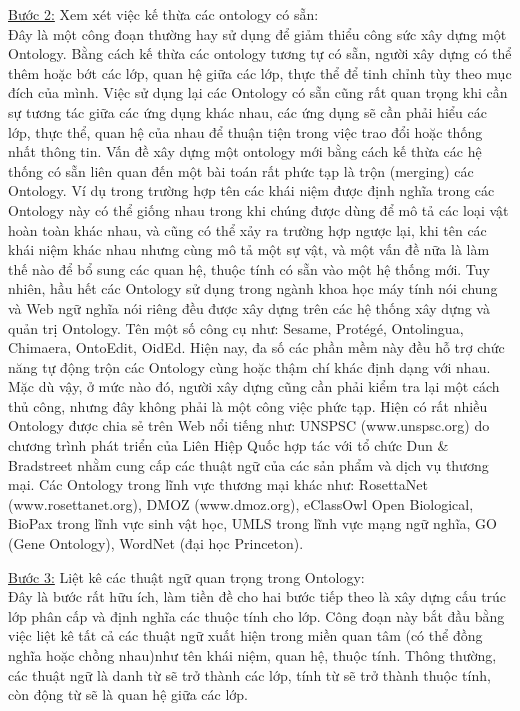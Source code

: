 \underline{Bước 2:} Xem xét việc kế thừa các ontology có sẵn: \\
Đây là một công đoạn thường hay sử dụng để giảm thiểu công sức xây dựng một Ontology. Bằng cách kế thừa các ontology tương tự có sẵn, người xây dựng có thể thêm hoặc bớt các lớp, quan hệ giữa các lớp, thực thể để tinh chỉnh tùy theo mục đích của mình. Việc sử dụng lại các Ontology có sẵn cũng rất quan trọng khi cần sự tương tác giữa các ứng dụng khác nhau, các ứng dụng sẽ cần phải hiểu các lớp, thực thể, quan hệ của nhau để thuận tiện trong việc trao đổi hoặc thống nhất thông tin.
Vấn đề xây dựng một ontology mới bằng cách kế thừa các hệ thống có sẵn liên quan đến một bài toán rất phức tạp là trộn (merging) các Ontology. Ví dụ trong trường hợp tên các khái niệm được định nghĩa trong các Ontology này có thể giống nhau trong khi chúng được dùng để mô tả các loại vật hoàn toàn khác nhau, và cũng có thể xảy ra trường hợp ngược lại, khi tên các khái niệm khác nhau nhưng cùng mô tả một sự vật, và một vấn đề nữa là làm thế nào để bổ sung các quan hệ, thuộc tính có sẵn vào một hệ thống mới. Tuy nhiên, hầu hết các Ontology sử dụng trong ngành khoa học máy tính nói chung và Web ngữ nghĩa nói riêng đều được xây dựng trên các hệ thống xây dựng và quản trị Ontology. Tên một số công cụ như: Sesame, Protégé, Ontolingua, Chimaera, OntoEdit, OidEd. Hiện nay, đa số các phần mềm này đều hỗ trợ chức năng tự động trộn các Ontology cùng hoặc thậm chí khác định dạng với nhau. Mặc dù vậy, ở mức nào đó, người xây dựng cũng cần phải kiểm tra lại một cách thủ công, nhưng đây không phải là một công việc phức tạp. Hiện có rất nhiều Ontology được chia sẻ trên Web nổi tiếng như: UNSPSC (www.unspsc.org) do chương trình phát triển của Liên Hiệp Quốc hợp tác với tổ chức Dun \& Bradstreet nhằm cung cấp các thuật ngữ của các sản phẩm và dịch vụ thương mại. Các
Ontology trong lĩnh vực thương mại khác như: RosettaNet (www.rosettanet.org), DMOZ (www.dmoz.org), eClassOwl Open Biological, BioPax trong lĩnh vực sinh vật học, UMLS trong lĩnh vực mạng ngữ nghĩa, GO (Gene Ontology), WordNet (đại học Princeton).

\underline{Bước 3:} Liệt kê các thuật ngữ quan trọng trong Ontology:\\
Đây là bước rất hữu ích, làm tiền đề cho hai bước tiếp theo là xây dựng cấu trúc lớp phân cấp và định nghĩa các thuộc tính cho lớp. Công đoạn này bắt đầu bằng việc liệt kê tất cả các thuật ngữ xuất hiện trong miền quan tâm (có thể đồng nghĩa hoặc chồng nhau)như tên khái niệm, quan hệ, thuộc tính. Thông thường, các thuật ngữ là danh từ sẽ trở thành các lớp, tính từ sẽ trở thành thuộc tính, còn động từ sẽ là quan hệ giữa các lớp. 

